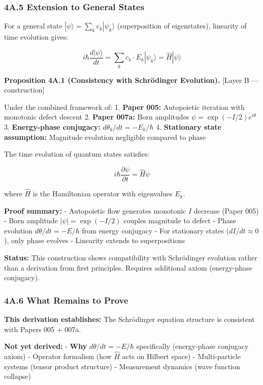 \documentclass[
]{article}
\begin{document}
\subsubsection{4A.5 Extension to General
States}\label{a.5-extension-to-general-states}

For a general state \(|\psi\rangle = \sum_k c_k |\psi_k\rangle\)
(superposition of eigenstates), linearity of time evolution gives:

\[i\hbar \frac{d|\psi\rangle}{dt} = \sum_k c_k \cdot E_k |\psi_k\rangle = \hat{H} |\psi\rangle\]

\textbf{Proposition 4A.1 (Consistency with Schrödinger Evolution).}
{[}Layer B --- construction{]}

Under the combined framework of: 1. \textbf{Paper 005:} Autopoietic
iteration with monotonic defect descent 2. \textbf{Paper 007a:} Born
amplitudes \(\psi = \exp(-I/2) e^{i\theta}\) 3. \textbf{Energy-phase
conjugacy:} \(d\theta_k/dt = -E_k/\hbar\) 4. \textbf{Stationary state
assumption:} Magnitude evolution negligible compared to phase

The time evolution of quantum states satisfies:

\[i\hbar \frac{\partial \psi}{\partial t} = \hat{H} \psi\]

where \(\hat{H}\) is the Hamiltonian operator with eigenvalues \(E_k\).

\textbf{Proof summary:} - Autopoietic flow generates monotonic \(I\)
decrease (Paper 005) - Born amplitude \(|\psi| = \exp(-I/2)\) couples
magnitude to defect - Phase evolution \(d\theta/dt = -E/\hbar\) from
energy conjugacy - For stationary states (\(dI/dt \approx 0\)), only
phase evolves - Linearity extends to superpositions

\textbf{Status:} This construction shows compatibility with Schrödinger
evolution rather than a derivation from first principles. Requires
additional axiom (energy-phase conjugacy).

\subsubsection{4A.6 What Remains to
Prove}\label{a.6-what-remains-to-prove}

\textbf{This derivation establishes:} The Schrödinger equation structure
is consistent with Papers 005 + 007a.

\textbf{Not yet derived:} - \textbf{Why} \(d\theta/dt = -E/\hbar\)
specifically (energy-phase conjugacy axiom) - Operator formalism (how
\(\hat{H}\) acts on Hilbert space) - Multi-particle systems (tensor
product structure) - Measurement dynamics (wave function collapse)
\end{document}
